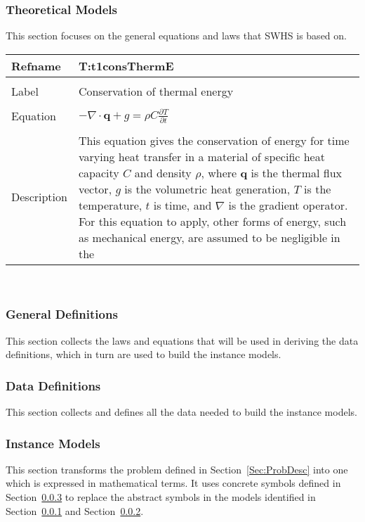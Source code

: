 \documentclass[12pt]{article}
\begin{document}
\subsubsection{Theoretical Models}
\label{Sec:TheoMode}
This section focuses on the general equations and laws that SWHS is based on.
~\newline
\noindent \begin{minipage}{\textwidth}
\begin{tabular}{p{} p{}}
\toprule \textbf{Refname} & \textbf{T:t1consThermE}
\label{T:t1consThermE}
\\ \midrule \\
Label & Conservation of thermal energy
\\ \midrule \\
Equation & $-\nabla{}\cdot{}\mathbf{q}+g=\rho{}C\frac{\partial{}T}{\partial{}t}$
\\ \midrule \\
Description & This equation gives the conservation of energy for time varying heat transfer in a material of specific heat capacity $C$ and density $\rho{}$, where $\mathbf{q}$ is the thermal flux vector, $g$ is the volumetric heat generation, $T$ is the temperature, $t$ is time, and $\nabla{}$ is the gradient operator. For this equation to apply, other forms of energy, such as mechanical energy, are assumed to be negligible in the
\\ \bottomrule \end{tabular}
\end{minipage}\\
\subsubsection{General Definitions}
\label{Sec:GeneDefi}
This section collects the laws and equations that will be used in deriving the data definitions, which in turn are used to build the instance models.
\subsubsection{Data Definitions}
\label{Sec:DataDefi}
This section collects and defines all the data needed to build the instance models.
\subsubsection{Instance Models}
\label{Sec:InstMode}
This section transforms the problem defined in Section~\ref{Sec:ProbDesc} into one which is expressed in mathematical terms. It uses concrete symbols defined in Section~\ref{Sec:DataDefi} to replace the abstract symbols in the models identified in Section~\ref{Sec:TheoMode} and Section~\ref{Sec:GeneDefi}.
\end{document}
